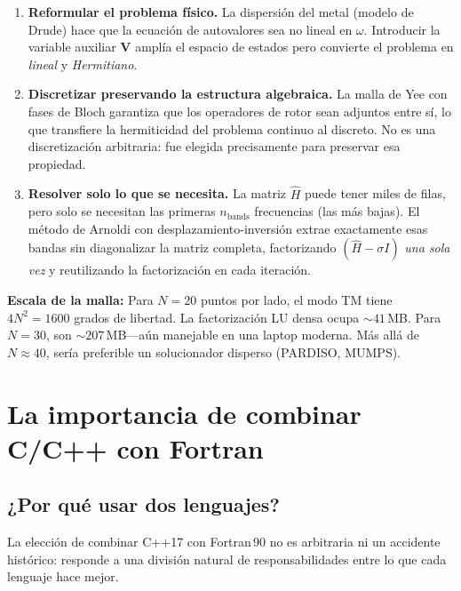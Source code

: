 \documentclass[12pt,a4paper]{article}
\begin{document}
\begin{enumerate}
    \item \textbf{Reformular el problema físico.} La dispersión del metal (modelo de Drude) hace que la ecuación de autovalores sea no lineal en $\omega$. Introducir la variable auxiliar $\mathbf{V}$ amplía el espacio de estados pero convierte el problema en \textit{lineal} y \textit{Hermitiano}.

    \item \textbf{Discretizar preservando la estructura algebraica.} La malla de Yee con fases de Bloch garantiza que los operadores de rotor sean adjuntos entre sí, lo que transfiere la hermiticidad del problema continuo al discreto. No es una discretización arbitraria: fue elegida precisamente para preservar esa propiedad.

    \item \textbf{Resolver solo lo que se necesita.} La matriz $\hat{H}$ puede tener miles de filas, pero solo se necesitan las primeras $n_{\text{bands}}$ frecuencias (las más bajas). El método de Arnoldi con desplazamiento-inversión extrae exactamente esas bandas sin diagonalizar la matriz completa, factorizando $(\hat{H}-\sigma I)$ \textit{una sola vez} y reutilizando la factorización en cada iteración.
\end{enumerate}

\begin{infobox}
    \textbf{Escala de la malla:} Para $N=20$ puntos por lado, el modo TM tiene $4N^2 = 1600$ grados de libertad. La factorización LU densa ocupa $\sim 41$\,MB. Para $N=30$, son $\sim 207$\,MB---aún manejable en una laptop moderna. Más allá de $N\approx40$, sería preferible un solucionador disperso (PARDISO, MUMPS).
\end{infobox}

\section{La importancia de combinar C/C++ con Fortran}

\subsection{¿Por qué usar dos lenguajes?}

La elección de combinar C++17 con Fortran\,90 no es arbitraria ni un accidente histórico: responde a una división natural de responsabilidades entre lo que cada lenguaje hace mejor.
\end{document}
